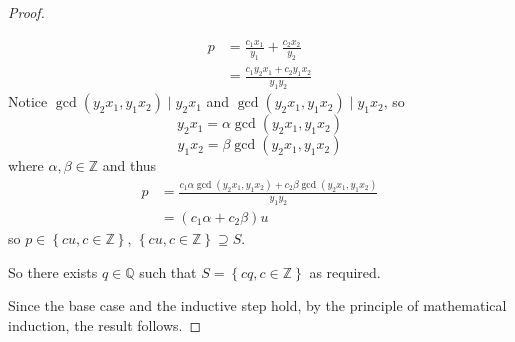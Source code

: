 \documentclass[letterpaper,12pt]{article}
\newcommand{\set}[1]{\left\{ #1 \right\}}
\theoremstyle{definition}
\begin{document}
\begin{enumerate}
\begin{mdframed}
\begin{proof}
\begin{itemize}
\begin{itemize}
\begin{align*}
                p &= \frac{c_1x_1}{y_1} + \frac{c_2 x_2}{y_2} \\
                &= \frac{c_1y_2x_1 + c_2 y_1x_2}{y_1y_2}
            \end{align*}
            Notice $\gcd (y_2x_1,y_1x_2) \mid y_2x_1$ and $\gcd (y_2x_1,y_1x_2) \mid y_1x_2$, so $$y_2x_1 = \alpha \gcd (y_2x_1,y_1x_2)$$ $$y_1x_2 = \beta \gcd (y_2x_1,y_1x_2)$$ where $\alpha,\beta \in \mathbb{Z}$ and thus
            \begin{align*}
                p &= \frac{c_1\alpha \gcd (y_2x_1,y_1x_2)  + c_2 \beta \gcd (y_2x_1,y_1x_2)}{y_1y_2} \\
                &= (c_1\alpha + c_2 \beta) u
            \end{align*}
            so $p \in \set{ cu, c \in \mathbb{Z} }$, $\set{ cu, c \in \mathbb{Z} } \supseteq S$.
        \end{itemize}
        So there exists $q \in \mathbb{Q}$ such that $S = \set{cq, c \in \mathbb{Z}}$ as required.
    \end{itemize}
    Since the base case and the inductive step hold, by the principle of mathematical induction, the result follows.
      \end{proof}
  \end{mdframed}
\end{enumerate}
\pagebreak
\end{document}
